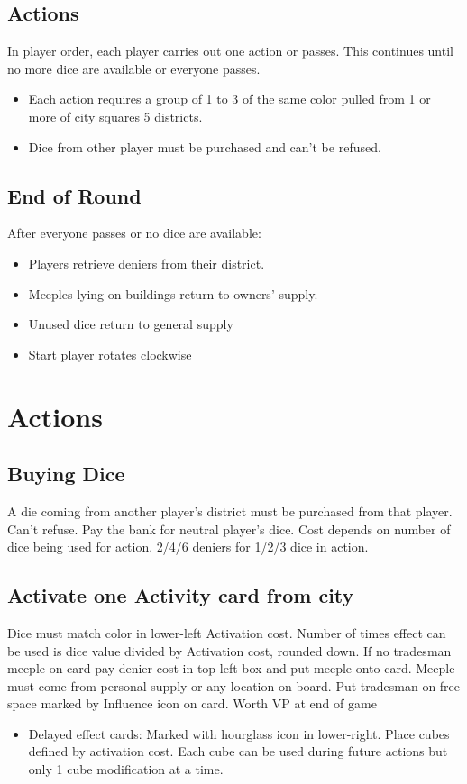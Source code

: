 \documentclass[10pt]{article}
\newenvironment{itemizeCustom}
{\begin{itemize}
  \setlength{\itemsep}{1pt}
  \setlength{\parskip}{0pt}
  \setlength{\parsep}{0pt}}
{\end{itemize}}
\begin{document}
\begin{multicols*}{2}
    \subsection*{Actions}
    In player order, each player carries out one action or passes. This continues until no more dice are available or everyone passes. 
    \begin{itemizeCustom}
        \item Each action requires a group of 1 to 3 of the same color pulled from 1 or more of city squares 5 districts. 
        \item Dice from other player must be purchased and can't be refused.
    \end{itemizeCustom}

    \subsection*{End of Round}
    After everyone passes or no dice are available:
    \begin{itemizeCustom}
        \item Players retrieve deniers from their district.
        \item Meeples lying on buildings return to owners' supply.
        \item Unused dice return to general supply
        \item Start player rotates clockwise
    \end{itemizeCustom}

\section*{Actions}
    \subsection*{Buying Dice}
    A die coming from another player's district must be purchased from that player. Can't refuse. Pay the bank for neutral player's dice. Cost depends on number of dice being used for action. 2/4/6 deniers for 1/2/3 dice in action.

    \subsection*{Activate one Activity card from city}
    Dice must match color in lower-left Activation cost. Number of times effect can be used is dice value divided by Activation cost, rounded down. If no tradesman meeple on card pay denier cost in top-left box and put meeple onto card. Meeple must come from personal supply or any location on board. Put tradesman on free space marked by Influence icon on card. Worth VP at end of game
    \begin{itemizeCustom}
        \item Delayed effect cards: Marked with hourglass icon in lower-right. Place cubes defined by activation cost. Each cube can be used during future actions but only 1 cube modification at a time.
    \end{itemizeCustom}


\end{multicols*}
\end{document}
